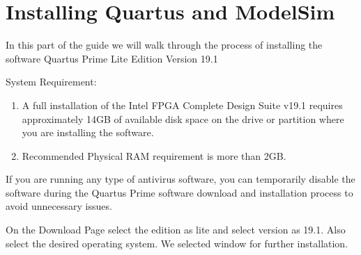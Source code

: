 \documentclass[12pt,singleside,a4paper]{article}
\begin{document}
\section{Installing Quartus and ModelSim}
\par In this part of the guide we will walk through the process of installing the software Quartus Prime Lite Edition Version 19.1\\
\par System Requirement: 
\begin{enumerate}
    \item A full installation of the Intel FPGA Complete Design Suite v19.1 requires approximately 14GB of available disk space on the drive or partition where you are installing the software.
    \item Recommended Physical RAM requirement is more than 2GB.
\end{enumerate}
\par If you are running any type of antivirus software, you can temporarily disable the software during the Quartus Prime software download and installation process to avoid unnecessary issues.
\par On the Download Page select the edition as lite and select version as 19.1.
Also select the desired operating system. We selected window for further installation. 
\end{document}
